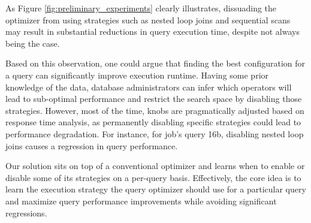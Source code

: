 As Figure \ref{fig:preliminary_experiments} clearly illustrates, dissuading the optimizer from using strategies such as nested loop joins and sequential scans may result in substantial reductions in query execution time, despite not always being the case.

Based on this observation, one could argue that finding the best configuration for a query can significantly improve execution runtime. Having some prior knowledge of the data, database administrators can infer which operators will lead to sub-optimal performance and restrict the search space by disabling those strategies. However, most of the time, knobs are pragmatically adjusted based on response time analysis, as permanently disabling specific strategies could lead to performance degradation. For instance, for \gls{job}'s query 16b, disabling nested loop joins causes a regression in query performance.

Our solution sits on top of a conventional optimizer and learns when to enable or disable some of its strategies on a per-query basis. Effectively, the core idea is to learn the execution strategy the query optimizer should use for a particular query and maximize query performance improvements while avoiding significant regressions.